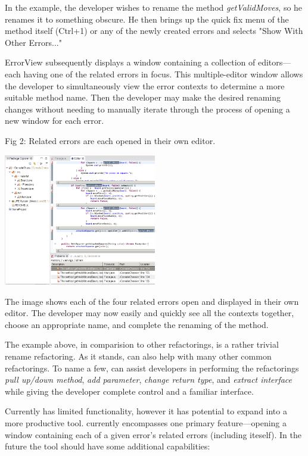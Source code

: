 \documentclass{sigplanconf}
\begin{document}
In the example, the developer wishes to rename the method
\textit{getValidMoves}, so he renames
it to something obscure. He then brings up the quick fix menu of the method
itself (Ctrl+1) or any of the newly created errors and selects
"Show With Other Errors..."

ErrorView subsequently displays a window containing a collection of
editors---each having
one of the related errors in focus. This multiple-editor window allows the
developer to simultaneously view the error
contexts to determine a more suitable method name. Then the developer may make
the desired renaming changes without needing to manually iterate through the
process of opening a new window for each error.
\begin{center}
\caption*{Fig 2: Related errors are each opened in their own editor.}
\includegraphics[width=0.50\textwidth]{multiple-editors.png}
\end{center}

The image shows each of the four related errors open and displayed in their own
editor. The developer may now easily and quickly see all the contexts together,
choose an appropriate name, and complete the renaming of the method.

The example above, in comparision to other refactorings,  is a rather trivial
rename refactoring. As it stands,
\pname{} can also help with many other common refactorings.
To name a few, \pname{} can assist developers in performing the refactorings
\textit{pull up/down method}, \textit{add parameter},
\textit{change return type}, and \textit{extract interface}
while giving the developer complete control and a familiar interface.

Currently \pname{} has limited functionality, however it has potential to expand
into a more productive tool. \pname{} currently encompasses one primary
feature---opening a window containing each of a given error's related errors
(including iteself). In the future the tool should have some additional
capabilities:
\end{document}
